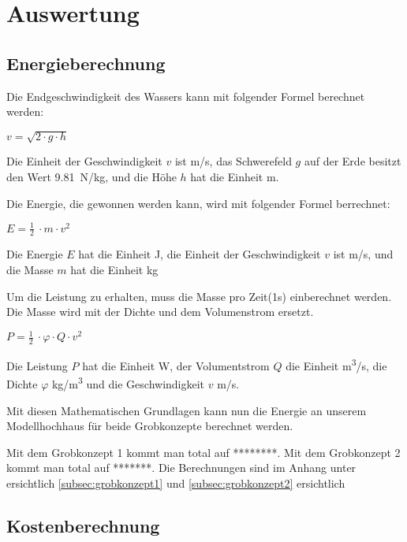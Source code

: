 \section{Auswertung} \label{sec:auswertung}



\subsection{Energieberechnung} \label{subsec:energieberechnung}

Die Endgeschwindigkeit des Wassers kann mit folgender Formel berechnet werden:
\begin{center}
\(v = \sqrt{2 \cdot g \cdot h} \)
\end{center}

Die Einheit der Geschwindigkeit \(v\) ist \si{m/s}, das Schwerefeld \(g\) auf der Erde besitzt den Wert 9.81~\si{N/kg}, und die Höhe \(h\) hat die Einheit \si{m}.

\bigskip

Die Energie, die gewonnen werden kann, wird mit folgender Formel berrechnet:

\begin{center}
\(E =\frac 12\ \cdot m \cdot v^2\)
\end{center}

Die Energie \(E\) hat die Einheit \si{J}, die Einheit der Geschwindigkeit \(v\) ist \si{m/s}, und die Masse \(m\) hat die Einheit \si{kg}

\bigskip

Um die Leistung zu erhalten, muss die Masse pro Zeit(1s) einberechnet werden. Die Masse wird mit der Dichte und dem Volumenstrom ersetzt.

\begin{center}
\(P =\frac 12\ \cdot \varphi \cdot Q \cdot v^2\)
\end{center}

Die Leistung \(P\) hat die Einheit \si{W}, der Volumentstrom \(Q\) die Einheit \si{m^3/s}, die Dichte \(\varphi\) \si{kg/m^3} und die Geschwindigkeit \(v\) \si{m/s}.

\newpage

Mit diesen Mathematischen Grundlagen kann nun die Energie an unserem Modellhochhaus für beide Grobkonzepte berechnet werden.

Mit dem Grobkonzept 1 kommt man total auf ********. Mit dem Grobkonzept 2 kommt man total auf *******. Die Berechnungen sind im Anhang unter  ersichtlich \ref{subsec:grobkonzept1}  und \ref{subsec:grobkonzept2}  ersichtlich


\subsection{Kostenberechnung} \label{subsec:kostenberechnung}